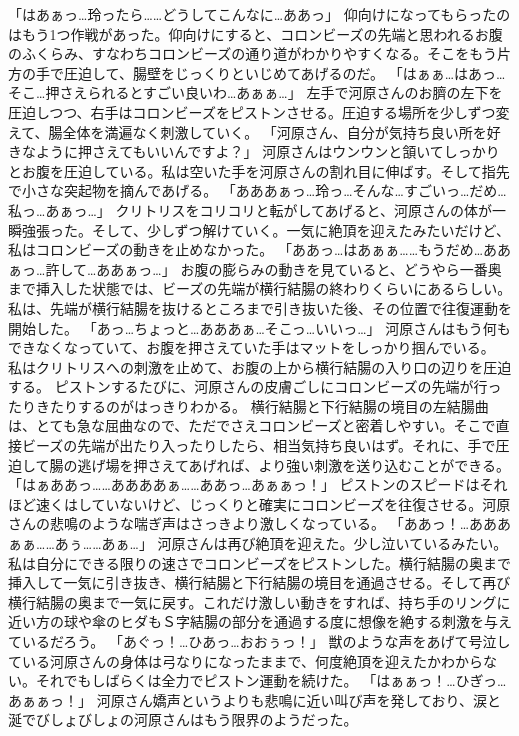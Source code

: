 「はあぁっ…玲ったら……どうしてこんなに…ああっ」
仰向けになってもらったのはもう1つ作戦があった。仰向けにすると、コロンビーズの先端と思われるお腹のふくらみ、すなわちコロンビーズの通り道がわかりやすくなる。そこをもう片方の手で圧迫して、腸壁をじっくりといじめてあげるのだ。
「はぁぁ…はあっ…そこ…押さえられるとすごい良いわ…あぁぁ…」
左手で河原さんのお臍の左下を圧迫しつつ、右手はコロンビーズをピストンさせる。圧迫する場所を少しずつ変えて、腸全体を満遍なく刺激していく。
「河原さん、自分が気持ち良い所を好きなように押さえてもいいんですよ？」
河原さんはウンウンと頷いてしっかりとお腹を圧迫している。私は空いた手を河原さんの割れ目に伸ばす。そして指先で小さな突起物を摘んであげる。
「あああぁっ…玲っ…そんな…すごいっ…だめ…私っ…あぁっ…」
クリトリスをコリコリと転がしてあげると、河原さんの体が一瞬強張った。そして、少しずつ解けていく。一気に絶頂を迎えたみたいだけど、私はコロンビーズの動きを止めなかった。
「ああっ…はあぁぁ……もうだめ…ああぁっ…許して…ああぁっ…」
お腹の膨らみの動きを見ていると、どうやら一番奥まで挿入した状態では、ビーズの先端が横行結腸の終わりくらいにあるらしい。私は、先端が横行結腸を抜けるところまで引き抜いた後、その位置で往復運動を開始した。
「あっ…ちょっと…あああぁ…そこっ…いいっ…」
河原さんはもう何もできなくなっていて、お腹を押さえていた手はマットをしっかり掴んでいる。
私はクリトリスへの刺激を止めて、お腹の上から横行結腸の入り口の辺りを圧迫する。
ピストンするたびに、河原さんの皮膚ごしにコロンビーズの先端が行ったりきたりするのがはっきりわかる。
横行結腸と下行結腸の境目の左結腸曲は、とても急な屈曲なので、ただでさえコロンビーズと密着しやすい。そこで直接ビーズの先端が出たり入ったりしたら、相当気持ち良いはず。それに、手で圧迫して腸の逃げ場を押さえてあげれば、より強い刺激を送り込むことができる。
「はぁああっ……ああああぁ……ああっ…あぁぁっ！」
ピストンのスピードはそれほど速くはしていないけど、じっくりと確実にコロンビーズを往復させる。河原さんの悲鳴のような喘ぎ声はさっきより激しくなっている。
「ああっ！…あああぁぁ……あぅ……あぁ…」
河原さんは再び絶頂を迎えた。少し泣いているみたい。
私は自分にできる限りの速さでコロンビーズをピストンした。横行結腸の奥まで挿入して一気に引き抜き、横行結腸と下行結腸の境目を通過させる。そして再び横行結腸の奥まで一気に戻す。これだけ激しい動きをすれば、持ち手のリングに近い方の球や傘のヒダもＳ字結腸の部分を通過する度に想像を絶する刺激を与えているだろう。
「あぐっ！…ひあっ…おおぅっ！」
獣のような声をあげて号泣している河原さんの身体は弓なりになったままで、何度絶頂を迎えたかわからない。それでもしばらくは全力でピストン運動を続けた。
「はぁぁっ！…ひぎっ…あぁぁっ！」
河原さん嬌声というよりも悲鳴に近い叫び声を発しており、涙と涎でびしょびしょの河原さんはもう限界のようだった。
